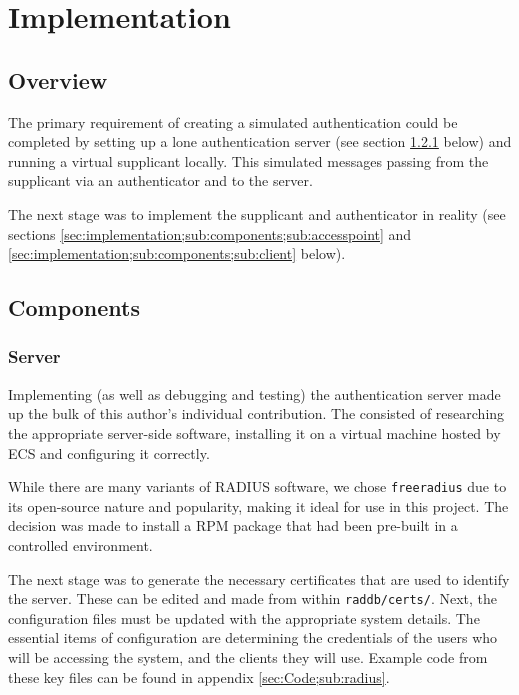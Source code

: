 \documentclass[12pt,a4paper,titlepage]{article}
\begin{document}
\newpage
\section{Implementation}

\subsection{Overview}
The primary requirement of creating a simulated authentication could be completed by setting up a lone authentication server (see section \ref{sec:implementation;sub:components;sub:server} below) and running a virtual supplicant locally. This simulated messages passing from the supplicant via an authenticator and to the server.

The next stage was to implement the supplicant and authenticator in reality (see sections \ref{sec:implementation;sub:components;sub:accesspoint} and \ref{sec:implementation;sub:components;sub:client} below).

\subsection{Components}

\subsubsection{Server}
\label{sec:implementation;sub:components;sub:server}
Implementing (as well as debugging and testing) the authentication server made up the bulk of this author's individual contribution. The consisted of researching the appropriate server-side software, installing it on a virtual machine hosted by ECS and configuring it correctly. 

While there are many variants of RADIUS software, we chose \texttt{freeradius} due to its open-source nature and popularity, making it ideal for use in this project. The decision was made to install a RPM package that had been pre-built in a controlled environment.

The next stage was to generate the necessary certificates that are used to identify the server. These can be edited and made from within \texttt{raddb/certs/}. Next, the configuration files must be updated with the appropriate system details. The essential items of configuration are determining the credentials of the users who will be accessing the system, and the clients they will use. Example code from these key files can be found in appendix \ref{sec:Code;sub:radius}.
\end{document}
